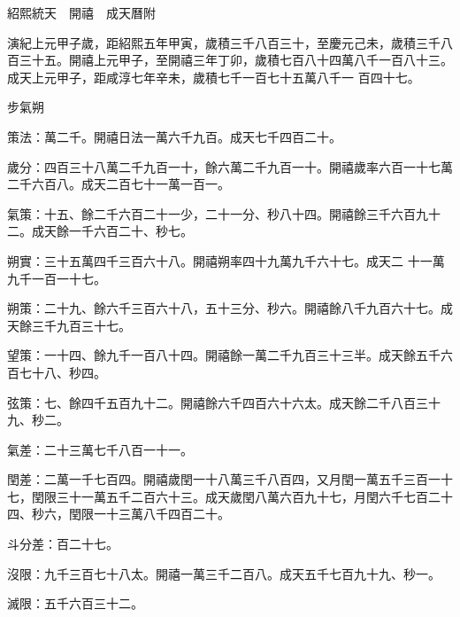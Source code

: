 
\begin{pinyinscope}

 紹熙統天　開禧　成天曆附



 演紀上元甲子歲，距紹熙五年甲寅，歲積三千八百三十，至慶元己未，歲積三千八百三十五。開禧上元甲子，至開禧三年丁卯，歲積七百八十四萬八千一百八十三。成天上元甲子，距咸淳七年辛未，歲積七千一百七十五萬八千一
 百四十七。



 步氣朔



 策法：萬二千。開禧日法一萬六千九百。成天七千四百二十。



 歲分：四百三十八萬二千九百一十，餘六萬二千九百一十。開禧歲率六百一十七萬二千六百八。成天二百七十一萬一百一。



 氣策：十五、餘二千六百二十一少，二十一分、秒八十四。開禧餘三千六百九十二。成天餘一千六百二十、秒七。



 朔實：三十五萬四千三百六十八。開禧朔率四十九萬九千六十七。成天二
 十一萬九千一百一十七。



 朔策：二十九、餘六千三百六十八，五十三分、秒六。開禧餘八千九百六十七。成天餘三千九百三十七。



 望策：一十四、餘九千一百八十四。開禧餘一萬二千九百三十三半。成天餘五千六百七十八、秒四。



 弦策：七、餘四千五百九十二。開禧餘六千四百六十六太。成天餘二千八百三十九、秒二。



 氣差：二十三萬七千八百一十一。



 閏差：二萬一千七百四。開禧歲閏一十八萬三千八百四，又月閏一萬五千三百一十七，閏限三十一萬五千二百六十三。成天歲閏八萬六百九十七，月閏六千七百二十四、秒六，閏限一十三萬八千四百二十。



 斗分差：百二十七。



 沒限：九千三百七十八太。開禧一萬三千二百八。成天五千七百九十九、秒一。



 滅限：五千六百三十二。




\end{pinyinscope}
